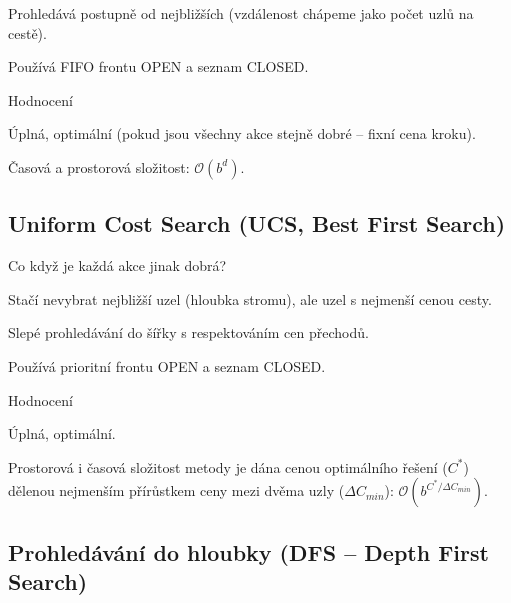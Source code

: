 \begin{compactitem}
    \item Prohledává postupně od nejbližších (vzdálenost chápeme jako počet uzlů na cestě).
    \item Používá FIFO frontu OPEN a seznam CLOSED.

    \item Hodnocení \begin{compactitem}
        \item Úplná, optimální (pokud jsou všechny akce stejně dobré -- fixní cena kroku).
        \item Časová a prostorová složitost: $\mathcal{O}(b^d)$.
    \end{compactitem}
\end{compactitem}

\subsection{Uniform Cost Search (UCS, Best First Search)}

\begin{compactitem}
    \item Co když je každá akce jinak dobrá? \begin{compactitem}
        \item Stačí nevybrat nejbližší uzel (hloubka stromu), ale uzel s nejmenší cenou cesty.
        \item Slepé prohledávání do šířky s respektováním cen přechodů.
    \end{compactitem}

    \item Používá prioritní frontu OPEN a seznam CLOSED.

    \item Hodnocení \begin{compactitem}
        \item Úplná, optimální.
        \item Prostorová i časová složitost metody je dána cenou optimálního řešení ($C^*$) dělenou nejmenším přírůstkem ceny mezi dvěma uzly ($\Delta C_{min}$): $\mathcal{O}(b^{C^* / \Delta C_{min}})$.
    \end{compactitem}
\end{compactitem}

\subsection{Prohledávání do hloubky (DFS -- Depth First Search)}


